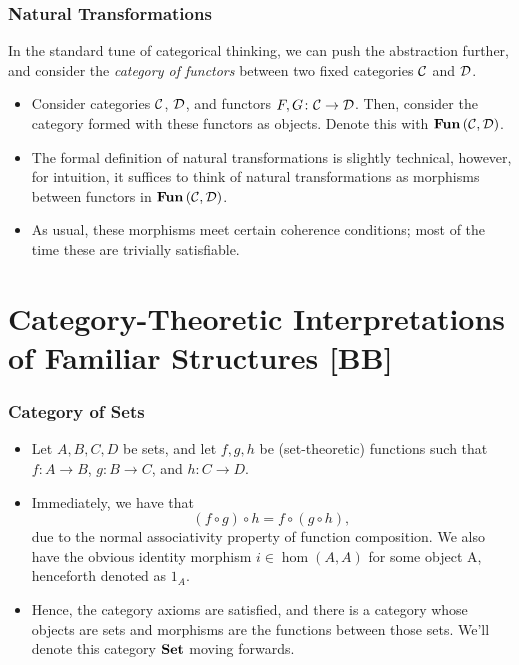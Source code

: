 \documentclass{beamer}
\numberwithin{figure}{section}
\DeclareMathOperator{\cathom}{hom}
\newcommand{\arbcat}[1]{\ensuremath\mathcal{#1}}
\DeclareMathOperator{\catset}{\text{\textbf{Set}}}
\DeclareMathOperator{\catfun}{\text{\textbf{Fun}}}
\begin{document}
\begin{frame}
        \frametitle{Natural Transformations}
        In the standard tune of categorical thinking, we can push the
        abstraction further, and consider the \emph{category of functors}
        between two fixed categories $\arbcat{C}$ and $\arbcat{D}$.
        \pause
        \begin{itemize}
                \item Consider categories $\arbcat{C}$, $\arbcat{D}$, and
                        functors $F, G \colon \arbcat{C} \to \arbcat{D}$. Then,
                        consider the category formed with these functors as
                        objects. Denote this with
                        $\catfun{(\arbcat{C},\arbcat{D})}$.
                \item The formal definition of natural transformations is
                        slightly technical, however, for intuition, it suffices
                        to think of natural transformations as morphisms between
                        functors in $\catfun{(\arbcat{C},\arbcat{D})}$.
                \item As usual, these morphisms meet certain coherence
                        conditions; most of the time these are trivially
                        satisfiable.
        \end{itemize}
\end{frame}

\section{Category-Theoretic Interpretations of Familiar Structures [BB]}
\begin{frame}
        \frametitle{Category of Sets}
        \begin{itemize}
                \item Let $A,B,C,D$ be sets, and let $f,g,h$ be (set-theoretic)
                        functions such that $f \colon A \to B$, $g \colon B \to
                        C$, and $h \colon C \to D$.
                \item Immediately, we have that
                        \begin{equation*}
                                \left( f \circ g \right) \circ h = f \circ
                                \left( g \circ h \right),
                        \end{equation*}
                        due to the normal associativity property of function
                        composition. We also have the obvious identity morphism
                        $i \in \cathom(A,A)$ for some object A, henceforth
                        denoted as $1_A$.
                \item Hence, the category axioms are satisfied, and there is a
                        category whose objects are sets and morphisms are the
                        functions between those sets. We'll denote this category
                        $\catset$ moving forwards.
        \end{itemize}
\end{frame}
\end{document}
